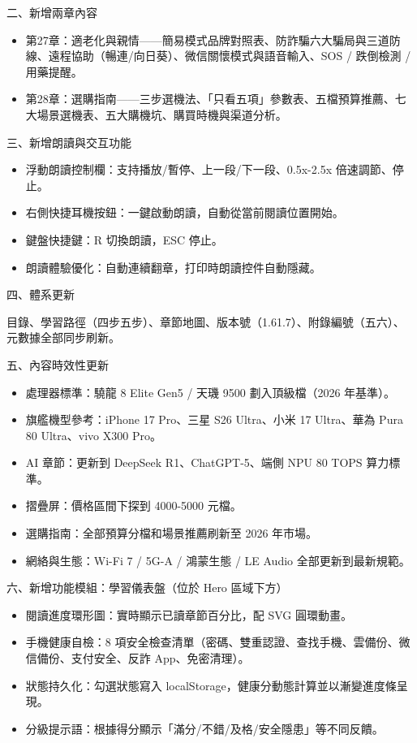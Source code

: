 二、新增兩章內容

\begin{itemize}
  \item 第27章：適老化與親情——簡易模式品牌對照表、防詐騙六大騙局與三道防線、遠程協助（暢連/向日葵）、微信關懷模式與語音輸入、SOS / 跌倒檢測 / 用藥提醒。
  \item 第28章：選購指南——三步選機法、「只看五項」參數表、五檔預算推薦、七大場景選機表、五大購機坑、購買時機與渠道分析。
\end{itemize}

三、新增朗讀與交互功能

\begin{itemize}
  \item 浮動朗讀控制欄：支持播放/暫停、上一段/下一段、0.5x-2.5x 倍速調節、停止。
  \item 右側快捷耳機按鈕：一鍵啟動朗讀，自動從當前閱讀位置開始。
  \item 鍵盤快捷鍵：R 切換朗讀，ESC 停止。
  \item 朗讀體驗優化：自動連續翻章，打印時朗讀控件自動隱藏。
\end{itemize}

四、體系更新

目錄、學習路徑（四步五步）、章節地圖、版本號（1.61.7）、附錄編號（五六）、元數據全部同步刷新。

五、內容時效性更新

\begin{itemize}
  \item 處理器標準：驍龍 8 Elite Gen5 / 天璣 9500 劃入頂級檔（2026 年基準）。
  \item 旗艦機型參考：iPhone 17 Pro、三星 S26 Ultra、小米 17 Ultra、華為 Pura 80 Ultra、vivo X300 Pro。
  \item AI 章節：更新到 DeepSeek R1、ChatGPT-5、端側 NPU 80 TOPS 算力標準。
  \item 摺疊屏：價格區間下探到 4000-5000 元檔。
  \item 選購指南：全部預算分檔和場景推薦刷新至 2026 年市場。
  \item 網絡與生態：Wi-Fi 7 / 5G-A / 鴻蒙生態 / LE Audio 全部更新到最新規範。
\end{itemize}

六、新增功能模組：學習儀表盤（位於 Hero 區域下方）

\begin{itemize}
  \item 閱讀進度環形圖：實時顯示已讀章節百分比，配 SVG 圓環動畫。
  \item 手機健康自檢：8 項安全檢查清單（密碼、雙重認證、查找手機、雲備份、微信備份、支付安全、反詐 App、免密清理）。
  \item 狀態持久化：勾選狀態寫入 localStorage，健康分動態計算並以漸變進度條呈現。
  \item 分級提示語：根據得分顯示「滿分/不錯/及格/安全隱患」等不同反饋。
\end{itemize}


